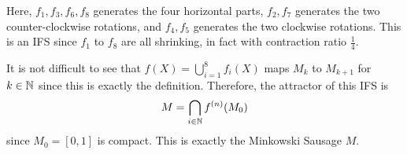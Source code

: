 \begin{itemize}
    Here, \(f_1, f_3, f_6, f_8\) generates the four horizontal parts, \(f_2, f_7\) generates the two counter-clockwise rotations, and \(f_4, f_5\) generates the two clockwise rotations. This is an IFS since \(f_1\) to \(f_8\) are all shrinking, in fact with contraction ratio \(\frac{1}{4}\).

    It is not difficult to see that \(f(X) = \bigcup_{i = 1}^{8} f_i(X)\) maps \(M_k\) to \(M_{k + 1}\) for \(k \in \mathbb{N}\) since this is exactly the definition. Therefore, the attractor of this IFS is
    \[
        M = \bigcap_{i \in \mathbb{N}} f^{(n)}(M_0)
    \]
    since \(M_0 = [0, 1]\) is compact. This is exactly the Minkowski Sausage \(M\).
\end{itemize}